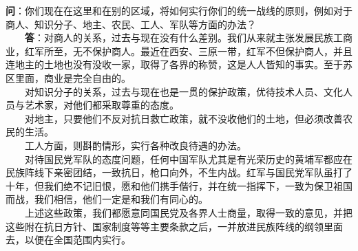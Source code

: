 \documentclass[cn,11pt,chinese]{elegantbook}
\begin{document}
\textbf{问}：你们现在在这里和在别的区域，将如何实行你们的统一战线的原则，例如对于商人、知识分子、地主、农民、工人、军队等方面的办法？\\
　　\textbf{答}：对商人的关系，过去与现在没有什么差别。我们从来就主张发展民族工商业，红军所至，无不保护商人。最近在西安、三原一带，红军不但保护商人，并且连地主的土地也没有没收一家，取得了各界的称赞，这是人人皆知的事实。至于苏区里面，商业是完全自由的。\\
　　对知识分子的关系，过去与现在也是一贯的保护政策，优待技术人员、文化人员与艺术家，对他们都采取尊重的态度。\\
　　对地主，只要他们不反对抗日救亡政策，就不没收他们的土地，但必须改善农民的生活。\\
　　工人方面，则斟酌情形，实行各种改良待遇的办法。\\
　　对待国民党军队的态度问题，任何中国军队尤其是有光荣历史的黄埔军都应在民族阵线下亲密团结，一致抗日，枪口向外，不生内战。红军与国民党军队虽打了十年，但我们绝不记旧恨，愿和他们携手偕行，并在统一指挥下，一致为保卫祖国而战，我们相信，他们一定是和我们有同心的。\\
　　上述这些政策，我们都愿意同国民党及各界人士商量，取得一致的意见，并把这些附在抗日方针、国家制度等等主要条款之后，一并放进民族阵线的纲领里面去，以便在全国范围内实行。\\
\end{document}
